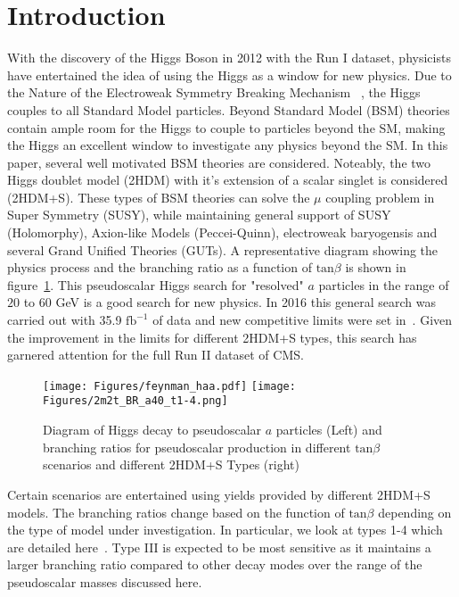 \section{Introduction}
With the discovery of the Higgs Boson in 2012 with the Run I dataset, physicists have entertained the idea of using the Higgs as a window for new physics.
Due to the Nature of the Electroweak Symmetry Breaking Mechanism ~\cite{Englert:1964et,Higgs:1964ia,Higgs:1964pj,Guralnik:1964eu,Higgs:1966ev,Kibble:1967sv}, the Higgs couples to all Standard Model particles.
Beyond Standard Model (BSM) theories contain ample room for the Higgs to couple to particles beyond the SM, making the Higgs an excellent window to investigate any physics beyond the SM.
In this paper, several well motivated BSM theories are considered.
Noteably, the two Higgs doublet model (2HDM) with it's extension of a scalar singlet is considered (2HDM+S).
These types of BSM theories can solve the $\mu$ coupling problem in Super Symmetry (SUSY), while maintaining general support of SUSY (Holomorphy), Axion-like Models (Peccei-Quinn), electroweak baryogensis and several Grand Unified Theories (GUTs).
A representative diagram showing the physics process and the branching ratio as a function of $\text{tan}\beta$ is shown in figure~\ref{fig:feynman_haa}. This pseudoscalar Higgs search for "resolved" $a$ particles in the range of $20$ to $60$ GeV is a good search for new physics.
In 2016 this general search was carried out with 35.9 $\text{fb}^{-1}$ of data and new competitive limits were set in~\cite{CMS-HIG-17-029}.
Given the improvement in the limits for different 2HDM+S types, this search has garnered attention for the full Run II dataset of CMS.

\begin{figure}[ht!b]
  \texttt{[image: Figures/feynman\_haa.pdf]}
  \texttt{[image: Figures/2m2t\_BR\_a40\_t1-4.png]}\\
    \caption{\label{fig:feynman_haa} Diagram of Higgs decay to pseudoscalar $a$ particles (Left) and branching ratios for pseudoscalar production in different $\text{tan}\beta$ scenarios and different 2HDM+S Types (right)}
\end{figure}

Certain scenarios are entertained using yields provided by different 2HDM+S models. The branching ratios change based on the function of $\text{tan}\beta$ depending on the type of model under investigation. In particular, we look at types 1-4 which are detailed here~\cite{Branco_2012}. Type III is expected to be most sensitive as it maintains a larger branching ratio compared to other decay modes over the range of the pseudoscalar masses discussed here.

